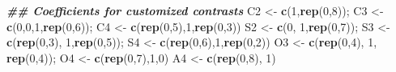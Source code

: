 \documentclass[
]{article}
\newenvironment{Shaded}{\begin{snugshade}}{\end{snugshade}}
\newcommand{\DecValTok}[1]{\textcolor[rgb]{0.00,0.00,0.81}{#1}}
\newcommand{\DocumentationTok}[1]{\textcolor[rgb]{0.56,0.35,0.01}{\textbf{\textit{#1}}}}
\newcommand{\FunctionTok}[1]{\textcolor[rgb]{0.13,0.29,0.53}{\textbf{#1}}}
\newcommand{\NormalTok}[1]{#1}
\newcommand{\OtherTok}[1]{\textcolor[rgb]{0.56,0.35,0.01}{#1}}
\begin{document}
\begin{Shaded}
\begin{Highlighting}[]
\DocumentationTok{\#\# Coefficients for customized contrasts }
\NormalTok{C2 }\OtherTok{\textless{}{-}} \FunctionTok{c}\NormalTok{(}\DecValTok{1}\NormalTok{,}\FunctionTok{rep}\NormalTok{(}\DecValTok{0}\NormalTok{,}\DecValTok{8}\NormalTok{)); C3 }\OtherTok{\textless{}{-}} \FunctionTok{c}\NormalTok{(}\DecValTok{0}\NormalTok{,}\DecValTok{0}\NormalTok{,}\DecValTok{1}\NormalTok{,}\FunctionTok{rep}\NormalTok{(}\DecValTok{0}\NormalTok{,}\DecValTok{6}\NormalTok{)); C4 }\OtherTok{\textless{}{-}} \FunctionTok{c}\NormalTok{(}\FunctionTok{rep}\NormalTok{(}\DecValTok{0}\NormalTok{,}\DecValTok{5}\NormalTok{),}\DecValTok{1}\NormalTok{,}\FunctionTok{rep}\NormalTok{(}\DecValTok{0}\NormalTok{,}\DecValTok{3}\NormalTok{))}
\NormalTok{S2 }\OtherTok{\textless{}{-}} \FunctionTok{c}\NormalTok{(}\DecValTok{0}\NormalTok{, }\DecValTok{1}\NormalTok{,}\FunctionTok{rep}\NormalTok{(}\DecValTok{0}\NormalTok{,}\DecValTok{7}\NormalTok{)); S3 }\OtherTok{\textless{}{-}} \FunctionTok{c}\NormalTok{(}\FunctionTok{rep}\NormalTok{(}\DecValTok{0}\NormalTok{,}\DecValTok{3}\NormalTok{), }\DecValTok{1}\NormalTok{,}\FunctionTok{rep}\NormalTok{(}\DecValTok{0}\NormalTok{,}\DecValTok{5}\NormalTok{)); S4 }\OtherTok{\textless{}{-}} \FunctionTok{c}\NormalTok{(}\FunctionTok{rep}\NormalTok{(}\DecValTok{0}\NormalTok{,}\DecValTok{6}\NormalTok{),}\DecValTok{1}\NormalTok{,}\FunctionTok{rep}\NormalTok{(}\DecValTok{0}\NormalTok{,}\DecValTok{2}\NormalTok{))}
\NormalTok{O3 }\OtherTok{\textless{}{-}} \FunctionTok{c}\NormalTok{(}\FunctionTok{rep}\NormalTok{(}\DecValTok{0}\NormalTok{,}\DecValTok{4}\NormalTok{), }\DecValTok{1}\NormalTok{, }\FunctionTok{rep}\NormalTok{(}\DecValTok{0}\NormalTok{,}\DecValTok{4}\NormalTok{)); O4 }\OtherTok{\textless{}{-}} \FunctionTok{c}\NormalTok{(}\FunctionTok{rep}\NormalTok{(}\DecValTok{0}\NormalTok{,}\DecValTok{7}\NormalTok{),}\DecValTok{1}\NormalTok{,}\DecValTok{0}\NormalTok{)}
\NormalTok{A4 }\OtherTok{\textless{}{-}} \FunctionTok{c}\NormalTok{(}\FunctionTok{rep}\NormalTok{(}\DecValTok{0}\NormalTok{,}\DecValTok{8}\NormalTok{), }\DecValTok{1}\NormalTok{)}



\end{Highlighting}
\end{Shaded}
\end{document}
